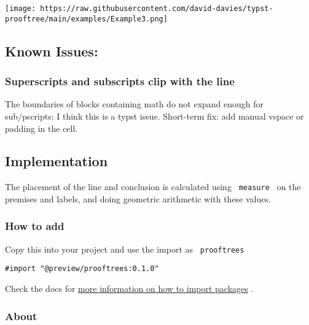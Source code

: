 \texttt{[image: https://raw.githubusercontent.com/david-davies/typst-prooftree/main/examples/Example3.png]}

\subsection{Known Issues:}\label{known-issues}

\subsubsection{Superscripts and subscripts clip with the
line}\label{superscripts-and-subscripts-clip-with-the-line}

The boundaries of blocks containing math do not expand enough for
sub/pscripts; I think this is a typst issue. Short-term fix: add manual
vspace or padding in the cell.

\subsection{Implementation}\label{implementation}

The placement of the line and conclusion is calculated using
\texttt{\ measure\ } on the premises and labels, and doing geometric
arithmetic with these values.

\subsubsection{How to add}\label{how-to-add}

Copy this into your project and use the import as
\texttt{\ prooftrees\ }

\begin{verbatim}
#import "@preview/prooftrees:0.1.0"
\end{verbatim}



Check the docs for
\href{https://typst.app/docs/reference/scripting/\#packages}{more
information on how to import packages} .

\subsubsection{About}\label{about}

